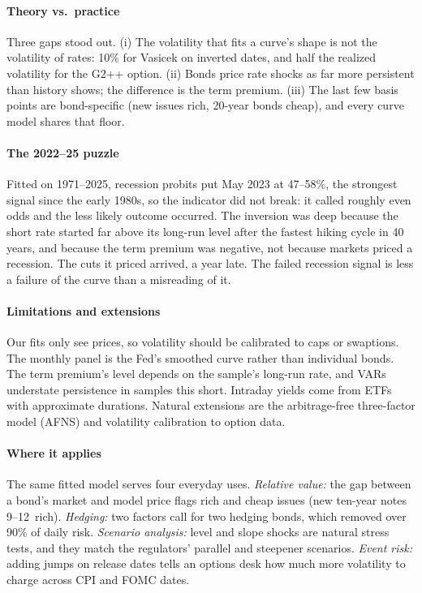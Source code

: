 \paragraph{Theory vs.\ practice} Three gaps stood out. (i) The volatility that fits a curve's shape is not the volatility of rates: 10\% for Vasicek on inverted dates, and half the realized volatility for the G2++ option. (ii) Bonds price rate shocks as far more persistent than history shows; the difference is the term premium. (iii) The last few basis points are bond-specific (new issues rich, 20-year bonds cheap), and every curve model shares that floor.

\paragraph{The 2022--25 puzzle} Fitted on 1971--2025, recession probits put May 2023 at 47--58\%, the strongest signal since the early 1980s, so the indicator did not break: it called roughly even odds and the less likely outcome occurred. The inversion was deep because the short rate started far above its long-run level after the fastest hiking cycle in 40 years, and because the term premium was negative, not because markets priced a recession. The cuts it priced arrived, a year late. The failed recession signal is less a failure of the curve than a misreading of it.

\paragraph{Limitations and extensions} Our fits only see prices, so volatility should be calibrated to caps or swaptions. The monthly panel is the Fed's smoothed curve rather than individual bonds. The term premium's level depends on the sample's long-run rate, and VARs understate persistence in samples this short. Intraday yields come from ETFs with approximate durations. Natural extensions are the arbitrage-free three-factor model (AFNS) and volatility calibration to option data.

\paragraph{Where it applies} The same fitted model serves four everyday uses. \emph{Relative value:} the gap between a bond's market and model price flags rich and cheap issues (new ten-year notes 9--12\bp\ rich). \emph{Hedging:} two factors call for two hedging bonds, which removed over 90\% of daily risk. \emph{Scenario analysis:} level and slope shocks are natural stress tests, and they match the regulators' parallel and steepener scenarios. \emph{Event risk:} adding jumps on release dates tells an options desk how much more volatility to charge across CPI and FOMC dates.

